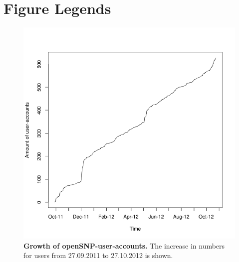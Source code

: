 \documentclass[10pt]{article}
\begin{document}
\section*{Figure Legends}
\begin{figure}[!ht]
	\begin{center}
		\includegraphics[scale=0.35]{25_10_2012_Graphs/users.png}
	\end{center}
	\caption{
	{\bf Growth of openSNP-user-accounts.} The increase in numbers for users from 27.09.2011 to 27.10.2012 is shown.} 
	\label{Figure1_label}
\end{figure}
\end{document}
